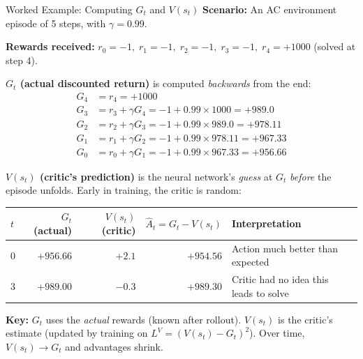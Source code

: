 \documentclass[aspectratio=169,11pt]{beamer}
\begin{document}
\begin{frame}{Worked Example: Computing $G_t$ and $V(s_t)$}
  \small
  \textbf{Scenario:} An AC environment episode of 5 steps, with $\gamma = 0.99$.

  \medskip
  \textbf{Rewards received:} $r_0 = -1,\; r_1 = -1,\; r_2 = -1,\; r_3 = -1,\; r_4 = +1000$ (solved at step 4).

  \medskip
  \textbf{$G_t$ (actual discounted return)} is computed \emph{backwards} from the end:
  \begin{align*}
    G_4 &= r_4 = +1000 \\
    G_3 &= r_3 + \gamma G_4 = -1 + 0.99 \times 1000 = +989.0 \\
    G_2 &= r_2 + \gamma G_3 = -1 + 0.99 \times 989.0 = +978.11 \\
    G_1 &= r_1 + \gamma G_2 = -1 + 0.99 \times 978.11 = +967.33 \\
    G_0 &= r_0 + \gamma G_1 = -1 + 0.99 \times 967.33 = +956.66
  \end{align*}
  \vspace{-10pt}

  \textbf{$V(s_t)$ (critic's prediction)} is the neural network's \emph{guess} at $G_t$
  \emph{before} the episode unfolds.  Early in training, the critic is random:

  \medskip
  \begin{center}\footnotesize
  \begin{tabular}{lrrrl}
    \toprule
    $t$ & $G_t$ (actual) & $V(s_t)$ (critic) & $\hat{A}_t = G_t - V(s_t)$ & \textbf{Interpretation} \\
    \midrule
    0 & $+956.66$ & $+2.1$ & $+954.56$ & Action much better than expected \\
    3 & $+989.00$ & $-0.3$ & $+989.30$ & Critic had no idea this leads to solve \\
    \bottomrule
  \end{tabular}
  \end{center}

  \smallskip
  \textbf{Key:} $G_t$ uses the \emph{actual} rewards (known after rollout).
  $V(s_t)$ is the critic's estimate (updated by training on $L^V = (V(s_t) - G_t)^2$).
  Over time, $V(s_t) \to G_t$ and advantages shrink.
\end{frame}
\end{document}
